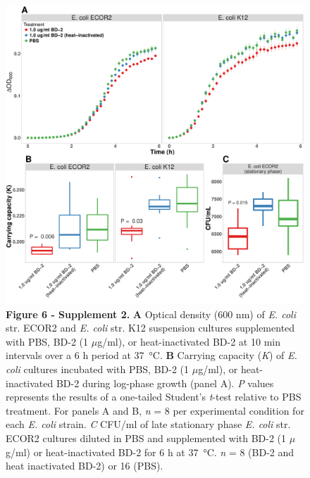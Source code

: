 \documentclass[9pt,lineo]{elife}
\begin{document}
\begin{figure}
\begin{fullwidth}
\centering\includegraphics[width=0.9\linewidth]{./figures/figure6/figure6_supplement2.pdf}
\caption*{\textbf{Figure 6 - Supplement 2. } \textbf{A} Optical density (600 nm) of \textit{E. coli} str. ECOR2 and \textit{E. coli} str. K12 suspension cultures supplemented with PBS, BD-2 (1 $\mu$g/ml), or heat-inactivated BD-2 at 10 min intervals over a 6 h period at \SI{37}{\celsius}. \textbf{B} Carrying capacity (\textit{K}) of \textit{E. coli} cultures incubated  with  PBS, BD-2 (1 $\mu$g/ml), or heat-inactivated BD-2 during log-phase growth (panel A). \textit{P} values represents the results of a one-tailed Student's \textit{t}-test relative to PBS treatment. For panels A and B, \textit{n} = 8 per experimental condition for each \textit{E. coli} strain. \textit{C} CFU/ml of late stationary phase \textit{E. coli} str. ECOR2 cultures diluted in PBS and supplemented with BD-2 (1 $\mu$g/ml) or heat-inactivated BD-2 for 6 h at \SI{37}{\celsius}. \textit{n} = 8 (BD-2 and heat inactivated BD-2) or 16 (PBS).}
\label{fig:fullwidth}
\end{fullwidth}
\end{figure}
\end{document}
